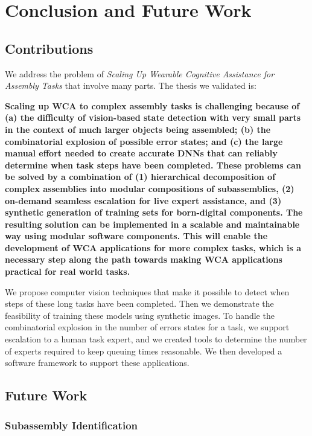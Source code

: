 \chapter{Conclusion and Future Work}\label{chap:conclusion}

\section{Contributions}

We address the problem of \textit{Scaling Up Wearable Cognitive Assistance for
  Assembly Tasks} that involve many parts.
The thesis we validated is:

\textbf{
  Scaling up WCA to complex assembly tasks is challenging because of
  (a) the difficulty of
  vision-based state detection with very small parts in the context of much
  larger objects being assembled; (b) the combinatorial explosion
  of possible error states; and (c) the large manual effort needed to create
  accurate DNNs that can reliably determine when task steps have been completed.
  These problems can be solved by a combination of (1) hierarchical
  decomposition of
  complex assemblies into modular compositions of subassemblies, (2) on-demand
  seamless
  escalation for live expert assistance, and (3) synthetic generation of
  training
  sets for born-digital components. The resulting solution can be implemented in
  a scalable and maintainable way using modular software components.
  This will enable the development of WCA applications for more complex tasks,
  which is a necessary step along the path towards making WCA applications
  practical for real world tasks.
}

We propose computer vision techniques that make it possible to detect when steps
of these long tasks have been completed.
Then we demonstrate the feasibility of training these models using synthetic
images.
To handle the combinatorial explosion in the number of errors states for a task,
we support escalation to a human task expert, and we created tools to determine
the number of experts required to keep queuing times reasonable.
We then developed a software framework to support these applications.

\section{Future Work}

\subsection{Subassembly Identification}

